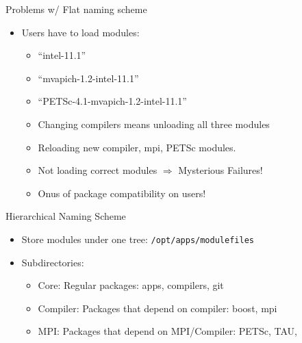 \documentclass{beamer}
\begin{document}
\begin{frame}{Problems w/ Flat naming scheme}
  \begin{itemize}
    \item Users have to load modules:
      \begin{itemize}
        \item ``intel-11.1''
        \item ``mvapich-1.2-intel-11.1''
        \item ``PETSc-4.1-mvapich-1.2-intel-11.1''
        \item Changing compilers means unloading all three modules
        \item Reloading new compiler, mpi, PETSc modules.
        \item Not loading correct modules $\Rightarrow$ Mysterious Failures!
        \item Onus of package compatibility on users! 
      \end{itemize}
  \end{itemize}
\end{frame}


\begin{frame}{Hierarchical Naming Scheme}
  \begin{itemize}
    \item Store modules under one tree: \texttt{/opt/apps/modulefiles}
    \item Subdirectories:
      \begin{itemize}
        \item Core: Regular packages: apps, compilers, git
        \item Compiler: Packages that depend on compiler: boost, mpi
        \item MPI: Packages that depend on MPI/Compiler: PETSc, TAU, 
      \end{itemize}
  \end{itemize}
\end{frame}
\end{document}
